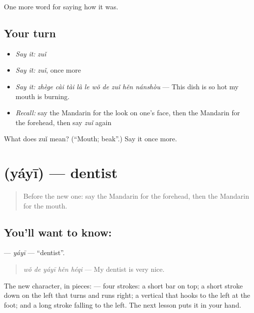 \begin{grammarlens}[title={What you've built}]
One more word for saying how it was.
\end{grammarlens}

\subsection*{Your turn}
\begin{itemize}
\raggedright
  \item \emph{Say it:} \emph{zuǐ}
  \item \emph{Say it:} \emph{zuǐ}, once more
  \item \emph{Say it:} \emph{zhège cài tài là le wǒ de zuǐ hěn nánshòu} — This dish is so hot my mouth is burning.
  \item \emph{Recall:} say the Mandarin for the look on one's face, then the Mandarin for the forehead, then say \emph{zuǐ} again
\end{itemize}

\begin{tcolorbox}[breakable,colback=teal!4,colframe=teal!35!black,title={Before you move on}]
What does zuǐ mean? (\textquotedblleft{}Mouth; beak\textquotedblright{}.) Say it once more.
\end{tcolorbox}
\section[\texorpdfstring{\zh{牙医} (yáyī)}{牙医 (yáyī)}]{ (yáyī) — dentist}

\label{lesson:ZH-C473-yayi}



\begin{quote}
Before the new one: say the Mandarin for the forehead, then the Mandarin for the mouth.
\end{quote}

\subsection*{You'll want to know: }
\textbf{} — \emph{yáyī} — \textquotedblleft{}dentist\textquotedblright{}.

\begin{quote}
\textbf{} \emph{wǒ de yáyī hěn héqi} — My dentist is very nice.
\end{quote}

The new character, in pieces:  — four strokes: a short bar on top; a short stroke down on the left that turns and runs right; a vertical that hooks to the left at the foot; and a long stroke falling to the left. The next lesson puts it in your hand.

